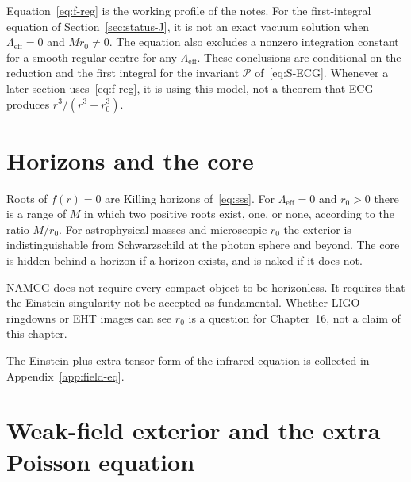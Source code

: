\begin{remark}
  Equation~\eqref{eq:f-reg} is the working profile of the notes.
  For the first-integral equation of Section~\ref{sec:status-J}, it
  is not an exact vacuum solution when \(\Lambda_{\mathrm{eff}}=0\)
  and \(Mr_0\neq0\). The equation also excludes a nonzero integration
  constant for a smooth regular centre for any \(\Lambda_{\mathrm{eff}}\).
  These conclusions are conditional on the reduction and the first
  integral for the invariant \(\mathcal P\) of~\eqref{eq:S-ECG}.
  Whenever a later section
  uses~\eqref{eq:f-reg}, it is using this model, not a theorem that
  ECG produces \(r^3/(r^3+r_0^3)\).
\end{remark}

\section{Horizons and the core}
\label{sec:ch13-horizons}

Roots of \(f(r)=0\) are Killing horizons of~\eqref{eq:sss}. For
\(\Lambda_{\mathrm{eff}}=0\) and \(r_0>0\) there is a range of
\(M\) in which two positive roots exist, one, or none, according
to the ratio \(M/r_0\). For astrophysical masses and microscopic
\(r_0\) the exterior is indistinguishable from Schwarzschild at
the photon sphere and beyond. The core is hidden behind a horizon
if a horizon exists, and is naked if it does not.

NAMCG does not require every compact object to be horizonless.
It requires that the Einstein singularity not be accepted as
fundamental. Whether LIGO ringdowns or EHT images can see
\(r_0\) is a question for Chapter~16, not a claim of this
chapter.

The Einstein-plus-extra-tensor form of the infrared equation
is collected in Appendix~\ref{app:field-eq}.

\section{Weak-field exterior and the extra Poisson equation}
\label{sec:ch13-poisson}

